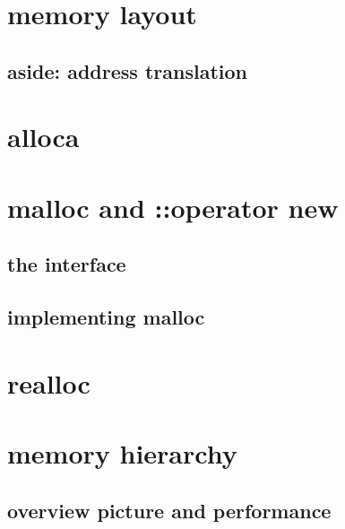 
\begin{frame}
    \titlepage
\end{frame}

\section{memory layout}




\subsection{aside: address translation}


\section{alloca}



\section{malloc and ::operator new}

\subsection{the interface}



\subsection{implementing malloc}



\section{realloc}



\section{memory hierarchy}

\subsection{overview picture and performance}

